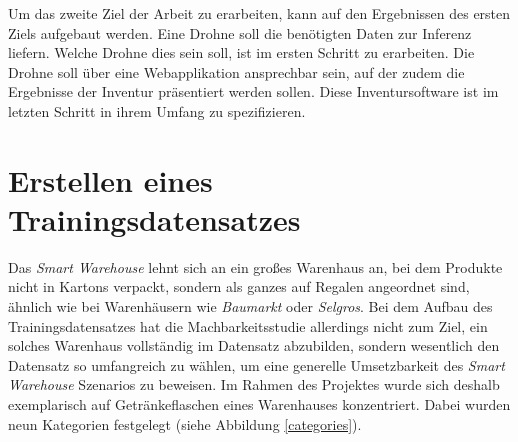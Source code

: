 Um das zweite Ziel der Arbeit zu erarbeiten, kann auf den Ergebnissen des ersten Ziels aufgebaut werden. Eine Drohne soll die benötigten Daten zur Inferenz liefern. Welche Drohne dies sein soll, ist im ersten Schritt zu erarbeiten. Die Drohne soll über eine Webapplikation ansprechbar sein, auf der zudem die Ergebnisse der Inventur präsentiert werden sollen. Diese Inventursoftware ist im letzten Schritt in ihrem Umfang zu spezifizieren.

\section{Erstellen eines Trainingsdatensatzes}

Das \textit{Smart Warehouse} lehnt sich an ein großes Warenhaus an, bei dem Produkte nicht in Kartons verpackt, sondern als ganzes auf Regalen angeordnet sind, ähnlich wie bei Warenhäusern wie \textit{Baumarkt} oder \textit{Selgros}. Bei dem Aufbau des Trainingsdatensatzes hat die Machbarkeitsstudie allerdings nicht zum Ziel, ein solches Warenhaus vollständig im Datensatz abzubilden, sondern wesentlich den Datensatz so umfangreich zu wählen, um eine generelle Umsetzbarkeit des \textit{Smart Warehouse} Szenarios zu beweisen. Im Rahmen des Projektes wurde sich deshalb exemplarisch auf Getränkeflaschen eines Warenhauses konzentriert. Dabei wurden neun Kategorien festgelegt (siehe Abbildung \ref{categories}). 

